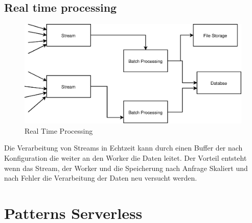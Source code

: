 \documentclass[
12pt,
english,
ngerman,
headsepline,
twoside,
openright,
numbers=noenddot,version=first
]{scrreprt}
\begin{document}
\subsection{Real time processing}
\begin{figure}
	\includegraphics[scale=0.36]{./pics/real-time-processing.eps}
	\caption{Real Time Processing}
	\label{pic:real-time-processing}
\end{figure}
Die Verarbeitung von Streams in Echtzeit kann durch einen Buffer der nach Konfiguration die weiter an den Worker die Daten leitet. Der Vorteil entsteht wenn das Stream, der Worker und die Speicherung nach Anfrage Skaliert und nach Fehler die Verarbeitung der Daten neu versucht werden. 



\section{Patterns Serverless}




\end{document}
